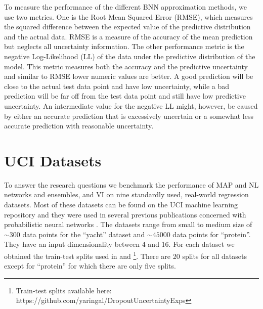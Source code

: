 \documentclass[../thesis.tex]{subfiles}
\begin{document}
To measure the performance of the different BNN approximation methods, we use two metrics. One is the Root Mean Squared Error (RMSE), which measures the squared difference between the expected value of the predictive distribution and the actual data. RMSE is a measure of the accuracy of the mean prediction but neglects all uncertainty information. The other performance metric is the negative Log-Likelihood (LL) of the data under the predictive distribution of the model. This metric measures both the accuracy and the predictive uncertainty and similar to RMSE lower numeric values are better. A good prediction will be close to the actual test data point and have low uncertainty, while a bad prediction will be far off from the test data point and still have low predictive uncertainty. An intermediate value for the negative LL might, however, be caused by either an accurate prediction that is excessively uncertain or a somewhat less accurate prediction with reasonable uncertainty. %


\section{UCI Datasets}
To answer the research questions we benchmark the performance of MAP and NL networks and ensembles, and VI on nine standardly used, real-world regression datasets. Most of these datasets can be found on the UCI machine learning repository \parencite{dua2017uci} and they were used in several previous publications concerned with probabilistic neural networks \parencite{hernandez2015probabilistic, gal2016dropout, lakshminarayanan2017simple, ghosh2018structured, sun2019functional, ober2019benchmarking}. The datasets range from small to medium size of ${\sim}300$ data points for the ``yacht'' dataset and ${\sim}45000$ data points for ``protein''. They have an input dimensionality between 4 and 16. For each dataset we obtained the train-test splits used in \textcite{gal2016dropout} and \textcite{hernandez2015probabilistic}\footnote{Train-test splits available here: https://github.com/yaringal/DropoutUncertaintyExps}. There are 20 splits for all datasets except for ``protein'' for which there are only five splits.
\end{document}
